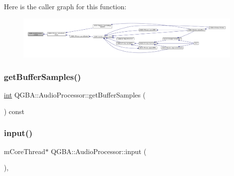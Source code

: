 Here is the caller graph for this function\+:
\nopagebreak
\begin{figure}[H]
\begin{center}
\leavevmode
\includegraphics[width=350pt]{class_q_g_b_a_1_1_audio_processor_a699614d282aa9cf042df8d23b9b5923a_icgraph}
\end{center}
\end{figure}
\mbox{\label{class_q_g_b_a_1_1_audio_processor_a44a16d22abaa070f9c7234b540287719}} 
\subsubsection{\texorpdfstring{get\+Buffer\+Samples()}{getBufferSamples()}}
{\footnotesize\ttfamily \mbox{\hyperlink{ioapi_8h_a787fa3cf048117ba7123753c1e74fcd6}{int}} Q\+G\+B\+A\+::\+Audio\+Processor\+::get\+Buffer\+Samples (\begin{DoxyParamCaption}{ }\end{DoxyParamCaption}) const\hspace{0.3cm}{\ttfamily [inline]}}

\mbox{\label{class_q_g_b_a_1_1_audio_processor_ad9001a38e63be82cbb2e582ac4162db9}} 
\subsubsection{\texorpdfstring{input()}{input()}}
{\footnotesize\ttfamily m\+Core\+Thread$\ast$ Q\+G\+B\+A\+::\+Audio\+Processor\+::input (\begin{DoxyParamCaption}{ }\end{DoxyParamCaption})\hspace{0.3cm}{\ttfamily [inline]}, {\ttfamily [protected]}}

